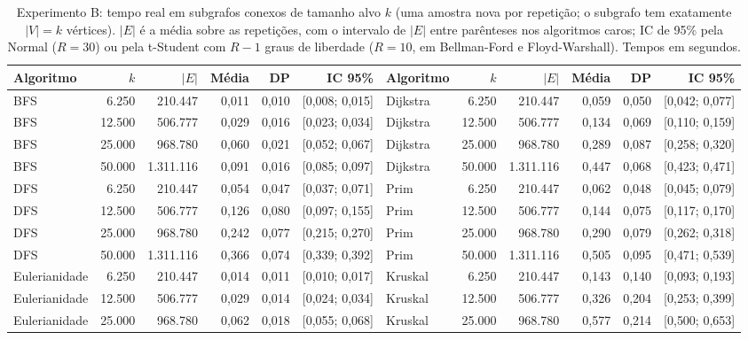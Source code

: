 \begin{table}[t]
\caption{Experimento B: tempo real em subgrafos conexos de tamanho alvo $k$ (uma amostra nova por repetição; o subgrafo tem exatamente $|V|=k$ vértices). $|E|$ é a média sobre as repetições, com o intervalo de $|E|$ entre parênteses nos algoritmos caros; IC de 95\% pela Normal ($R=30$) ou pela t-Student com $R-1$ graus de liberdade ($R=10$, em Bellman-Ford e Floyd-Warshall). Tempos em segundos.}
\label{tab:p2amostras}
\footnotesize
\setlength{\tabcolsep}{2.2pt}
\begin{tabular}{@{}lrrrrr@{\hspace{0.8em}}lrrrrr@{}}
\toprule
Algoritmo & $k$ & $|E|$ & Média & DP & IC 95\% & Algoritmo & $k$ & $|E|$ & Média & DP & IC 95\% \\
\midrule
BFS & 6.250 & 210.447 & 0{,}011 & 0{,}010 & [0{,}008; 0{,}015] & Dijkstra & 6.250 & 210.447 & 0{,}059 & 0{,}050 & [0{,}042; 0{,}077] \\
BFS & 12.500 & 506.777 & 0{,}029 & 0{,}016 & [0{,}023; 0{,}034] & Dijkstra & 12.500 & 506.777 & 0{,}134 & 0{,}069 & [0{,}110; 0{,}159] \\
BFS & 25.000 & 968.780 & 0{,}060 & 0{,}021 & [0{,}052; 0{,}067] & Dijkstra & 25.000 & 968.780 & 0{,}289 & 0{,}087 & [0{,}258; 0{,}320] \\
BFS & 50.000 & 1.311.116 & 0{,}091 & 0{,}016 & [0{,}085; 0{,}097] & Dijkstra & 50.000 & 1.311.116 & 0{,}447 & 0{,}068 & [0{,}423; 0{,}471] \\
DFS & 6.250 & 210.447 & 0{,}054 & 0{,}047 & [0{,}037; 0{,}071] & Prim & 6.250 & 210.447 & 0{,}062 & 0{,}048 & [0{,}045; 0{,}079] \\
DFS & 12.500 & 506.777 & 0{,}126 & 0{,}080 & [0{,}097; 0{,}155] & Prim & 12.500 & 506.777 & 0{,}144 & 0{,}075 & [0{,}117; 0{,}170] \\
DFS & 25.000 & 968.780 & 0{,}242 & 0{,}077 & [0{,}215; 0{,}270] & Prim & 25.000 & 968.780 & 0{,}290 & 0{,}079 & [0{,}262; 0{,}318] \\
DFS & 50.000 & 1.311.116 & 0{,}366 & 0{,}074 & [0{,}339; 0{,}392] & Prim & 50.000 & 1.311.116 & 0{,}505 & 0{,}095 & [0{,}471; 0{,}539] \\
Eulerianidade & 6.250 & 210.447 & 0{,}014 & 0{,}011 & [0{,}010; 0{,}017] & Kruskal & 6.250 & 210.447 & 0{,}143 & 0{,}140 & [0{,}093; 0{,}193] \\
Eulerianidade & 12.500 & 506.777 & 0{,}029 & 0{,}014 & [0{,}024; 0{,}034] & Kruskal & 12.500 & 506.777 & 0{,}326 & 0{,}204 & [0{,}253; 0{,}399] \\
Eulerianidade & 25.000 & 968.780 & 0{,}062 & 0{,}018 & [0{,}055; 0{,}068] & Kruskal & 25.000 & 968.780 & 0{,}577 & 0{,}214 & [0{,}500; 0{,}653] \\

\end{tabular}
\end{table}
